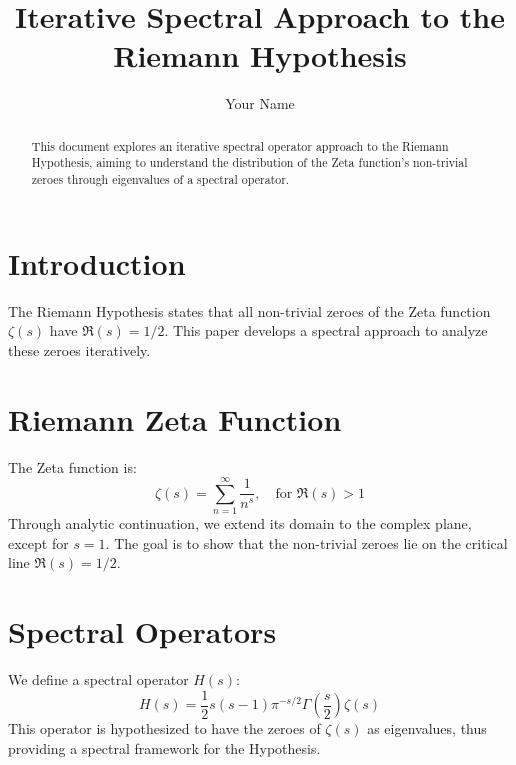 \documentclass{article}
\title{Iterative Spectral Approach to the Riemann Hypothesis}
\author{Your Name}
\begin{document}
\maketitle

\begin{abstract}
This document explores an iterative spectral operator approach to the Riemann Hypothesis, aiming to understand the distribution of the Zeta function's non-trivial zeroes through eigenvalues of a spectral operator.
\end{abstract}

\section{Introduction}
The Riemann Hypothesis states that all non-trivial zeroes of the Zeta function $\zeta(s)$ have $\Re(s) = 1/2$. This paper develops a spectral approach to analyze these zeroes iteratively.

\section{Riemann Zeta Function}
The Zeta function is:
\[
\zeta(s) = \sum_{n=1}^{\infty} \frac{1}{n^s}, \quad \text{for } \Re(s) > 1
\]
Through analytic continuation, we extend its domain to the complex plane, except for $s = 1$. The goal is to show that the non-trivial zeroes lie on the critical line $\Re(s) = 1/2$.

\section{Spectral Operators}
We define a spectral operator $H(s)$:
\[
H(s) = \frac{1}{2}s(s-1)\pi^{-s/2}\Gamma\left(\frac{s}{2}\right)\zeta(s)
\]
This operator is hypothesized to have the zeroes of $\zeta(s)$ as eigenvalues, thus providing a spectral framework for the Hypothesis.
\end{document}
